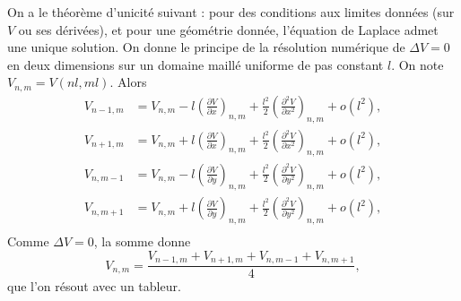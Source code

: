         On a le théorème d'unicité suivant : pour des conditions aux limites données (sur $V$ ou ses dérivées), et pour une géométrie donnée, l'équation de Laplace admet une unique solution. On donne le principe de la résolution numérique de $\Delta V=0$ en deux dimensions sur un domaine maillé uniforme de pas constant $l$. On note $V_{n,m}=V(nl,ml)$.
        Alors
        \begin{equation*}
            \begin{aligned}
                V_{n-1,m}&= V_{n,m}-l\left(\frac{\partial V}{\partial x}\right)_{n,m}+\frac{l^{2}}{2}\left(\frac{\partial^{2}V}{\partial x^{2}}\right)_{n,m}+o(l^{2}),\\
                V_{n+1,m}&= V_{n,m}+l\left(\frac{\partial V}{\partial x}\right)_{n,m}+\frac{l^{2}}{2}\left(\frac{\partial^{2}V}{\partial x^{2}}\right)_{n,m}+o(l^{2}),\\
                V_{n,m-1}&= V_{n,m}-l\left(\frac{\partial V}{\partial y}\right)_{n,m}+\frac{l^{2}}{2}\left(\frac{\partial^{2}V}{\partial y^{2}}\right)_{n,m}+o(l^{2}),\\
                V_{n,m+1}&= V_{n,m}+l\left(\frac{\partial V}{\partial y}\right)_{n,m}+\frac{l^{2}}{2}\left(\frac{\partial^{2}V}{\partial y^{2}}\right)_{n,m}+o(l^{2}),\\
            \end{aligned}
        \end{equation*}
        Comme $\Delta V=0$, la somme donne
        \begin{equation*}
            \boxed{
                V_{n,m}=\frac{V_{n-1,m}+V_{n+1,m}+V_{n,m-1}+V_{n,m+1}}{4},
            }
        \end{equation*}
        que l'on résout avec un tableur.